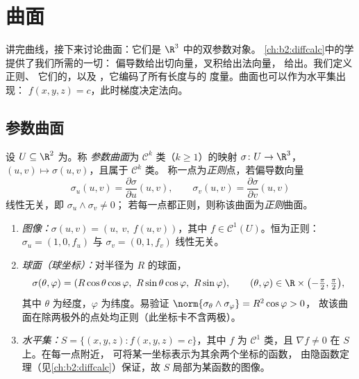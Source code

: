 \chapter{曲面}\label{ch:b2:surfaces}

讲完曲线，接下来讨论曲面：它们是 $\R^3$ 中的双参数对象。
\cref{ch:b2:diffcalc}中的学提供了我们所需的一切：
偏导数给出切向量，叉积给出法向量，
给出。我们定义正则、
它们的，以及
\emph{}，它编码了所有长度与的
度量。曲面也可以作为水平集出现：
$f(x, y, z) = c$，此时梯度决定法向。

\section{参数曲面}

\begin{definition}[正则参数曲面]\label{def:b2:surfaces:param}
设 $U \subseteq \R^2$ 为。称
\emph{参数曲面}为 $\mathcal{C}^k$ 类（$k \geq 1$）的映射
$\sigma \colon U \to
\R^3$，$(u, v) \mapsto \sigma(u, v)$，且属于 $\mathcal{C}^k$ 类。
称一点为\emph{正则}点，若偏导数向量
\[
\sigma_u(u, v) = \frac{\partial\sigma}{\partial u}(u,v),
\qquad
\sigma_v(u, v) = \frac{\partial\sigma}{\partial v}(u,v)
\]
线性无关，即 $\sigma_u \wedge \sigma_v \neq 0$；
若每一点都正则，则称该曲面为\emph{正则}曲面。
\end{definition}

\begin{example}[三种标准描述]\label{ex:b2:surfaces:standard}
\leavevmode
\begin{enumerate}
\item \emph{图像：}$\sigma(u, v) = (u,\ v,\ f(u, v))$，其中 $f \in
\mathcal{C}^1(U)$。恒为正则：$\sigma_u = (1, 0, f_u)$ 与
$\sigma_v = (0, 1, f_v)$ 线性无关。
\item \emph{球面（球坐标）：}对半径为
$R$ 的球面，
\[
\sigma(\theta, \varphi)
= (R\cos\theta\cos\varphi,\ R\sin\theta\cos\varphi,\
R\sin\varphi),
\qquad
(\theta, \varphi) \in \R \times
\bigl(-\tfrac\pi2, \tfrac\pi2\bigr),
\]
其中 $\theta$ 为经度，$\varphi$ 为纬度。易验证
$\norm{\sigma_\theta \wedge \sigma_\varphi} = R^2\cos\varphi > 0$，
故该曲面在除两极外的点处均正则（此坐标卡不含两极）。
\item \emph{水平集：}$S = \{(x,y,z) : f(x, y, z) = c\}$，其中
$f$ 为 $\mathcal{C}^1$ 类，且 $\nabla f \neq 0$ 在 $S$ 上。在每一点附近，
可将某一坐标表示为其余两个坐标的函数，
由隐函数定理（见\cref{ch:b2:diffcalc}）保证，故
$S$ 局部为某函数的图像。
\end{enumerate}
\end{example}

